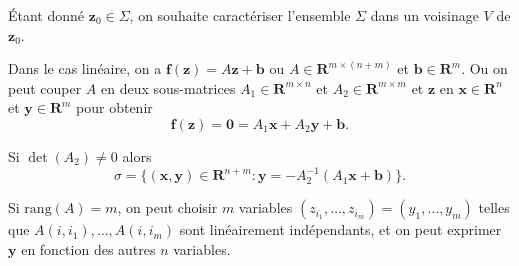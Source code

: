 Étant donné $\boldsymbol{z}_{0}\in\Sigma$, on souhaite caractériser l'ensemble $\Sigma$ dans un voisinage $V$ de $\boldsymbol{z}_{0}$.

Dans le cas linéaire, on a $\boldsymbol{f}(\boldsymbol{z})=A\boldsymbol{z}+\boldsymbol{b}$ ou $A\in \mathbf{R}^{m\times(n+m)}$ et $\boldsymbol{b}\in \mathbf{R}^{m}$. Ou on peut couper $A$ en deux sous-matrices $A_{1}\in \mathbf{R}^{m\times n}$ et $A_{2}\in \mathbf{R}^{m\times m}$ et $\boldsymbol{z}$ en $\boldsymbol{x}\in \mathbf{R}^{n}$ et $\boldsymbol{y}\in \mathbf{R}^{m}$ pour obtenir
$$
\boldsymbol{f}(\boldsymbol{z})=\boldsymbol{0}=A_{1}\boldsymbol{x}+A_{2}\boldsymbol{y}+\boldsymbol{b}.
$$

Si $\det(A_{2})\neq 0$ alors 
$$
\sigma=\{ (\boldsymbol{x},\boldsymbol{y})\in \mathbf{R}^{n+m}:\boldsymbol{y}=-A_{2}^{-1}(A_{1}\boldsymbol{x}+\boldsymbol{b}) \}.
$$

Si $\mathrm{rang}(A)=m$, on peut choisir $m$ variables $(z_{i_{1}},\dots,z_{i_{m}})=(y_{1},\dots,y_{m})$ telles que $A(i,i_{1}),\dots,A(i,i_{m})$ sont linéairement indépendants, et on peut exprimer $\boldsymbol{y}$ en fonction des autres $n$ variables.

